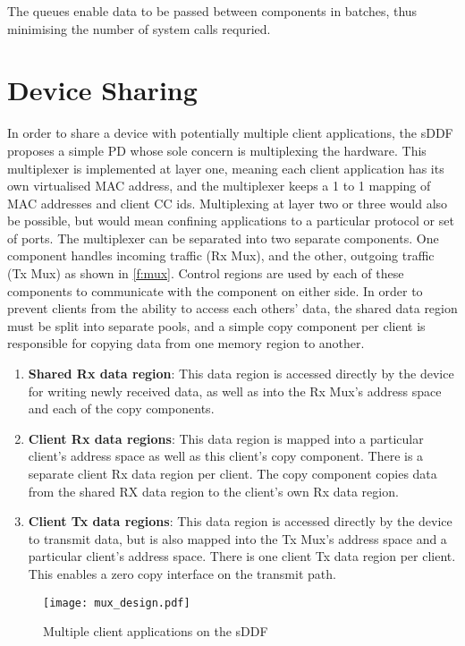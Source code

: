 The queues enable data to be passed between components in batches, thus minimising the number of system calls requried. 

\section{Device Sharing}\label{s:mux_design}
In order to share a device with potentially multiple client applications, the sDDF proposes a simple PD whose 
sole concern is multiplexing the hardware. This multiplexer is implemented at layer one, meaning each client application has its
own virtualised MAC address, and the multiplexer keeps a 1 to 1 mapping of MAC addresses and client CC ids. Multiplexing at layer two
or three would also be possible, but would mean confining applications to a particular protocol or set of ports. 
The multiplexer
can be separated into two separate components. One component handles incoming traffic (Rx Mux), and the other, outgoing traffic
(Tx Mux) as shown in \autoref{f:mux}. Control regions are used by each of these components to communicate with the component on 
either side.
In order to prevent clients from the ability to access each others' data, the shared data region must be split into
separate pools, and a simple copy component per client is responsible for copying data from one memory region to another.
\begin{enumerate}
\item \textbf{Shared Rx data region}: This data region is accessed directly by the device for writing newly received data, as well
as into the Rx Mux's address space and each of the copy components.
\item \textbf{Client Rx data regions}: This data region is mapped into a particular client's address space as well as this
client's copy component. There is a separate client Rx data region per client. The copy component copies data from the 
shared RX data region to the client's own Rx data region.
\item \textbf{Client Tx data regions}: This data region is accessed directly by the device to transmit data, but is also mapped into
the Tx Mux's address space and a particular client's address space. There is one client Tx data region per client. This
enables a zero copy interface on the transmit path.
\end{enumerate}

\begin{figure}[h]
    \centering
    \texttt{[image: mux\_design.pdf]}
    \caption{Multiple client applications on the sDDF}
    \label{f:mux}
\end{figure}

